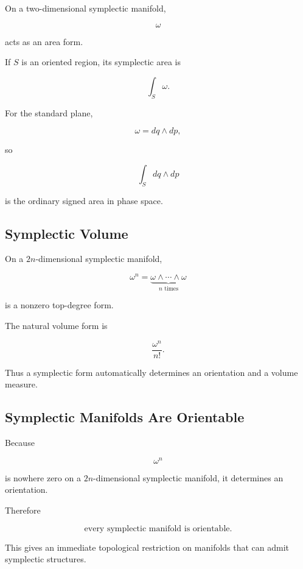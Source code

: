 On a two-dimensional symplectic manifold,

\[
\omega
\]

acts as an area form.

If \(S\) is an oriented region, its symplectic area is

\[
\boxed{
\int_S\omega.
}
\]

For the standard plane,

\[
\omega=dq\wedge dp,
\]

so

\[
\boxed{
\int_S dq\wedge dp
}
\]

is the ordinary signed area in phase space.

\subsection{Symplectic Volume}
\label{subsec:symplectic-volume}

On a \(2n\)-dimensional symplectic manifold,

\[
\omega^n
=
\underbrace{
\omega\wedge\cdots\wedge\omega
}_{n\text{ times}}
\]

is a nonzero top-degree form.

The natural volume form is

\[
\boxed{
\frac{\omega^n}{n!}.
}
\]

Thus a symplectic form automatically determines an orientation and a volume
measure.

\subsection{Symplectic Manifolds Are Orientable}
\label{subsec:symplectic-orientability}

Because

\[
\omega^n
\]

is nowhere zero on a \(2n\)-dimensional symplectic manifold, it determines
an orientation.

Therefore

\[
\boxed{
\text{every symplectic manifold is orientable}.
}
\]

This gives an immediate topological restriction on manifolds that can admit
symplectic structures.

